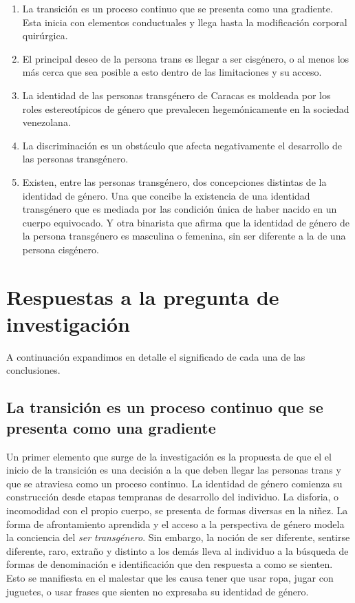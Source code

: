 \begin{enumerate}

  \item La transición es un proceso continuo que se presenta como una gradiente.
  Esta inicia con elementos conductuales y llega hasta la modificación corporal
  quirúrgica.

  \item El principal deseo de la persona trans es llegar a ser cisgénero, o al
  menos los más cerca que sea posible a esto dentro de las limitaciones y su
  acceso.

  \item La identidad de las personas transgénero de Caracas es moldeada por los
  roles estereotípicos de género que prevalecen hegemónicamente en la sociedad
  venezolana.

  \item La discriminación es un obstáculo que afecta negativamente el desarrollo
  de las personas transgénero.

  \item Existen, entre las personas transgénero, dos concepciones distintas de
  la identidad de género. Una que concibe la existencia de una identidad
  transgénero que es mediada por las condición única de haber nacido en un
  cuerpo equivocado. Y otra binarista que afirma que la identidad de género de
  la persona transgénero es masculina o femenina, sin ser diferente a la de una
  persona cisgénero.

\end{enumerate}

\section{Respuestas a la pregunta de investigación}


A continuación expandimos en detalle el significado de cada una de las
conclusiones.

\subsection[La transición es un proceso continuo]{La transición es un proceso continuo que se presenta como una gradiente}

Un primer elemento que surge de la investigación es la propuesta de que el el
inicio de la transición es una decisión a la que deben llegar las personas trans
y que se atraviesa como un proceso continuo. La identidad de género comienza su
construcción desde etapas tempranas de desarrollo del individuo. La disforia, o
incomodidad con el propio cuerpo, se presenta de formas diversas en la niñez. La
forma de afrontamiento aprendida y el acceso a la perspectiva de género modela
la conciencia del \emph{ser transgénero}. Sin embargo, la noción de ser
diferente, sentirse diferente, raro, extraño y distinto a los demás lleva al
individuo a la búsqueda de formas de denominación e identificación que den
respuesta a como se sienten. Esto se manifiesta en el malestar que les causa
tener que usar ropa, jugar con juguetes, o usar frases que sienten no expresaba
su identidad de género.

